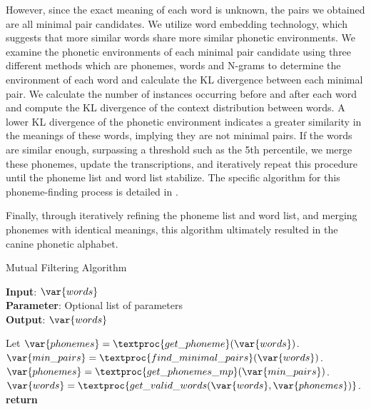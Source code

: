 However, since the exact meaning of each word is unknown, the pairs we obtained are all minimal pair candidates. We utilize word embedding technology, which suggests that more similar words share more similar phonetic environments. We examine the phonetic environments of each minimal pair candidate using three different methods which are phonemes, words and N-grams to determine the environment of each word and calculate the KL divergence between each minimal pair. We calculate the number of instances occurring before and after each word and compute the KL divergence of the context distribution between words. A lower KL divergence of the phonetic environment indicates a greater similarity in the meanings of these words, implying they are not minimal pairs. If the words are similar enough, surpassing a threshold such as the 5th percentile, we merge these phonemes, update the transcriptions, and iteratively repeat this procedure until the phoneme list and word list stabilize. The specific algorithm for this phoneme-finding process is detailed in .

Finally, through iteratively refining the phoneme list and word list, and merging phonemes with identical meanings, this algorithm ultimately resulted in the canine phonetic alphabet.

\begin{algorithm}[tb]
\caption{Mutual Filtering Algorithm}
\label{alg:ifa}
\textbf{Input}: $\var{words}$\\
\textbf{Parameter}: Optional list of parameters\\
\textbf{Output}: $\var{words}$
\begin{algorithmic}[1] %
\STATE Let $\var{phonemes} = \textproc{get\_phoneme}(\var{words})$.
\STATE $\var{min\_pairs} = \textproc{find\_minimal\_pairs}(\var{words})$.
\STATE $\var{phonemes} = \textproc{get\_phonemes\_mp}(\var{min\_pairs})$.
\STATE $\var{words} = \textproc{get\_valid\_words(\var{words}, \var{phonemes})}$.
\ENDWHILE
\STATE \textbf{return} 
\end{algorithmic}
\end{algorithm}


